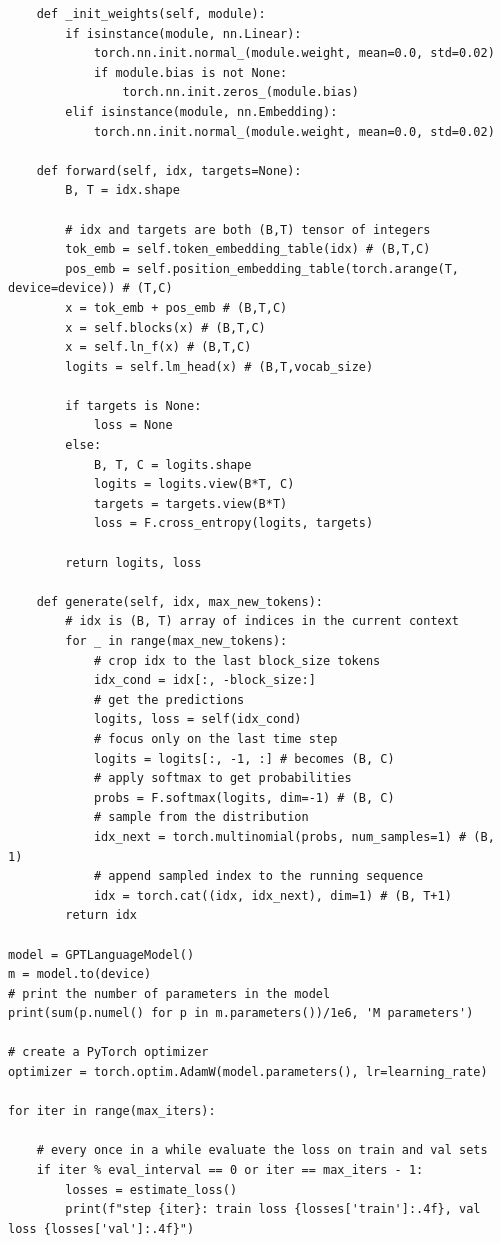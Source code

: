 \begin{verbatim}
    def _init_weights(self, module):
        if isinstance(module, nn.Linear):
            torch.nn.init.normal_(module.weight, mean=0.0, std=0.02)
            if module.bias is not None:
                torch.nn.init.zeros_(module.bias)
        elif isinstance(module, nn.Embedding):
            torch.nn.init.normal_(module.weight, mean=0.0, std=0.02)

    def forward(self, idx, targets=None):
        B, T = idx.shape

        # idx and targets are both (B,T) tensor of integers
        tok_emb = self.token_embedding_table(idx) # (B,T,C)
        pos_emb = self.position_embedding_table(torch.arange(T, device=device)) # (T,C)
        x = tok_emb + pos_emb # (B,T,C)
        x = self.blocks(x) # (B,T,C)
        x = self.ln_f(x) # (B,T,C)
        logits = self.lm_head(x) # (B,T,vocab_size)

        if targets is None:
            loss = None
        else:
            B, T, C = logits.shape
            logits = logits.view(B*T, C)
            targets = targets.view(B*T)
            loss = F.cross_entropy(logits, targets)

        return logits, loss

    def generate(self, idx, max_new_tokens):
        # idx is (B, T) array of indices in the current context
        for _ in range(max_new_tokens):
            # crop idx to the last block_size tokens
            idx_cond = idx[:, -block_size:]
            # get the predictions
            logits, loss = self(idx_cond)
            # focus only on the last time step
            logits = logits[:, -1, :] # becomes (B, C)
            # apply softmax to get probabilities
            probs = F.softmax(logits, dim=-1) # (B, C)
            # sample from the distribution
            idx_next = torch.multinomial(probs, num_samples=1) # (B, 1)
            # append sampled index to the running sequence
            idx = torch.cat((idx, idx_next), dim=1) # (B, T+1)
        return idx

model = GPTLanguageModel()
m = model.to(device)
# print the number of parameters in the model
print(sum(p.numel() for p in m.parameters())/1e6, 'M parameters')

# create a PyTorch optimizer
optimizer = torch.optim.AdamW(model.parameters(), lr=learning_rate)

for iter in range(max_iters):

    # every once in a while evaluate the loss on train and val sets
    if iter % eval_interval == 0 or iter == max_iters - 1:
        losses = estimate_loss()
        print(f"step {iter}: train loss {losses['train']:.4f}, val loss {losses['val']:.4f}")


\end{verbatim}

